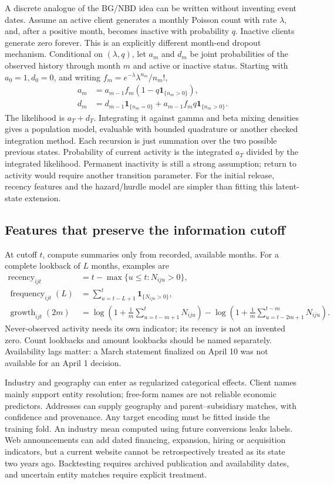 A discrete analogue of the BG/NBD idea can be written without inventing event dates. Assume an active client generates a monthly Poisson count with rate $\lambda$, and, after a positive month, becomes inactive with probability $q$. Inactive clients generate zero forever. This is an explicitly different month-end dropout mechanism. Conditional on $(\lambda,q)$, let $a_m$ and $d_m$ be joint probabilities of the observed history through month $m$ and active or inactive status. Starting with $a_0=1,d_0=0$, and writing $f_m=e^{-\lambda}\lambda^{n_m}/n_m!$,
\begin{align}
 a_m&=a_{m-1}f_m\left(1-q\mathbf1_{\{n_m>0\}}\right),\\
 d_m&=d_{m-1}\mathbf1_{\{n_m=0\}}
        +a_{m-1}f_m q\mathbf1_{\{n_m>0\}}.
 \label{eq:monthly-forward}
\end{align}
The likelihood is $a_T+d_T$. Integrating it against gamma and beta mixing densities gives a population model, evaluable with bounded quadrature or another checked integration method. Each recursion is just summation over the two possible previous states. Probability of current activity is the integrated $a_T$ divided by the integrated likelihood. Permanent inactivity is still a strong assumption; return to activity would require another transition parameter. For the initial release, recency features and the hazard/hurdle model are simpler than fitting this latent-state extension.

\subsection{Features that preserve the information cutoff}

At cutoff $t$, compute summaries only from recorded, available months. For a complete lookback of $L$ months, examples are
\begin{align*}
 \operatorname{recency}_{ijt}&=t-\max\{u\le t:N_{iju}>0\},\\
 \operatorname{frequency}_{ijt}(L)&=\sum_{u=t-L+1}^t\mathbf1_{\{N_{iju}>0\}},\\
 \operatorname{growth}_{ijt}(2m)&=
 \log\left(1+\frac1m\sum_{u=t-m+1}^{t}N_{iju}\right)
 -\log\left(1+\frac1m\sum_{u=t-2m+1}^{t-m}N_{iju}\right).
\end{align*}
Never-observed activity needs its own indicator; its recency is not an invented zero. Count lookbacks and amount lookbacks should be named separately. Availability lags matter: a March statement finalized on April 10 was not available for an April 1 decision.

Industry and geography can enter as regularized categorical effects. Client names mainly support entity resolution; free-form names are not reliable economic predictors. Addresses can supply geography and parent--subsidiary matches, with confidence and provenance. Any target encoding must be fitted inside the training fold. An industry mean computed using future conversions leaks labels. Web announcements can add dated financing, expansion, hiring or acquisition indicators, but a current website cannot be retrospectively treated as its state two years ago. Backtesting requires archived publication and availability dates, and uncertain entity matches require explicit treatment.
